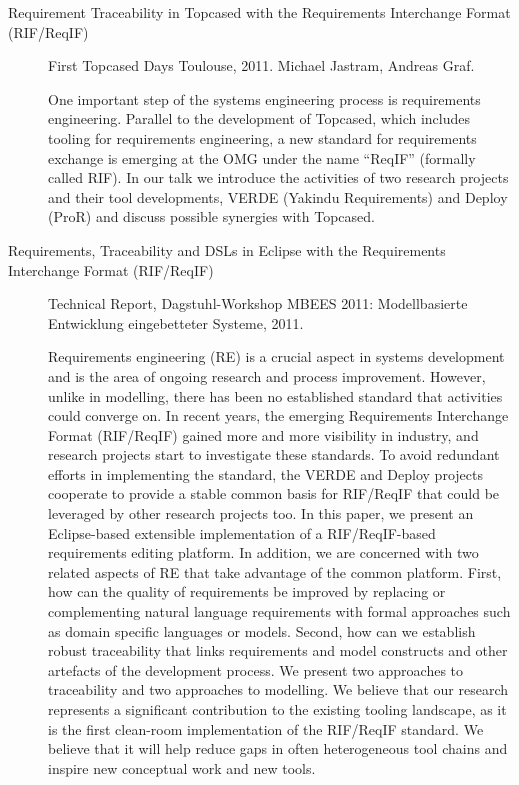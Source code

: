\begin{description}
\item[Requirement Traceability in Topcased with the Requirements Interchange Format (RIF/ReqIF)] First Topcased Days Toulouse, 2011. Michael Jastram, Andreas Graf.

One important step of the systems engineering process is requirements engineering. Parallel to the development of Topcased, which includes tooling for requirements engineering, a new standard for requirements exchange is emerging at the OMG under the name “ReqIF” (formally called RIF). In our talk we introduce the activities of two research projects and their tool developments, VERDE (Yakindu Requirements) and Deploy (ProR) and discuss possible synergies with Topcased.

\item[Requirements, Traceability and DSLs in Eclipse with the Requirements Interchange Format (RIF/ReqIF)] Technical Report, Dagstuhl-Workshop MBEES 2011: Modellbasierte Entwicklung eingebetteter Systeme, 2011.

Requirements engineering (RE) is a crucial aspect in systems development and is the area of ongoing research and process improvement. However, unlike in modelling, there has been no established standard that activities could converge on.
In recent years, the emerging Requirements Interchange Format (RIF/ReqIF) gained more and more visibility in industry, and research projects start to investigate these standards. To avoid redundant efforts in implementing the standard, the VERDE and Deploy projects cooperate to provide a stable common basis for RIF/ReqIF that could be leveraged by other research projects too. In this paper, we present an Eclipse-based extensible implementation of a RIF/ReqIF-based requirements editing platform.
In addition, we are concerned with two related aspects of RE that take advantage of the common platform. First, how can the quality of requirements be improved by replacing or complementing natural language requirements with formal approaches such as domain specific languages or models. Second, how can we establish robust traceability that links requirements and model constructs and other artefacts of the development process. We present two approaches to traceability and two approaches to modelling.
We believe that our research represents a significant contribution to the existing tooling landscape, as it is the first clean-room implementation of the RIF/ReqIF standard. We believe that it will help reduce gaps in often heterogeneous tool chains and inspire new conceptual work and new tools.

\end{description}

